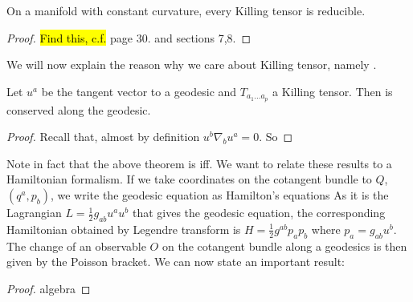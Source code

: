 \documentclass{article}
\begin{document}
\begin{theorem}
On a manifold with constant curvature, every Killing tensor is reducible. 
\end{theorem}
\begin{proof}
\hl{Find this, c.f. }\cite{Benenti1991SeparationEquation} page 30. and  \cite{Heil2016KillingTensors} sections 7,8. 
\end{proof}

We will now explain the reason why we care about Killing tensor, namely . 

\begin{prop}
Let $u^a$ be the tangent vector to a geodesic and $T_{a_1 \dots a_p}$ a Killing tensor. Then 
is conserved along the geodesic.
\end{prop}
\begin{proof}
Recall that, almost by definition $u^b \nabla_b u^a = 0$. So 
\end{proof}
Note in fact that the above theorem is iff. We want to relate these results to a Hamiltonian formalism. If we take coordinates on the cotangent bundle to $Q$, $(q^a,p_b)$, we write the geodesic equation as Hamilton's equations 
As it is the Lagrangian $L= \frac{1}{2}g_{ab} u^a u^b$ that gives the geodesic equation, the corresponding Hamiltonian obtained by Legendre transform is $H = \frac{1}{2}g^{ab}p_a p_b$ where $p_a = g_{ab}u^b$. The change of an observable $O$ on the cotangent bundle along a geodesics is then given by 
the Poisson bracket. We can now state an important result:
\begin{prop}
\end{prop}
\begin{proof}
algebra
\end{proof}

\begin{corollary}
\end{corollary}
\end{document}

